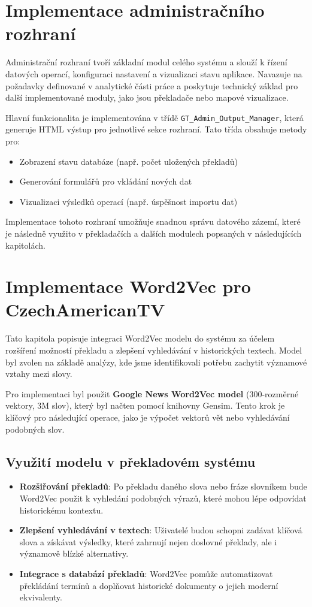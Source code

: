 \documentclass[czech, ba, kiv, he]{fasthesis}
\begin{document}
\section{Implementace administračního rozhraní}

Administrační rozhraní tvoří základní modul celého systému a slouží k řízení datových operací, konfiguraci nastavení a vizualizaci stavu aplikace. Navazuje na požadavky definované v analytické části práce a poskytuje technický základ pro další implementované moduly, jako jsou překladače nebo mapové vizualizace.

Hlavní funkcionalita je implementována v třídě \texttt{GT\_Admin\_Output\_Manager}, která generuje HTML výstup pro jednotlivé sekce rozhraní. Tato třída obsahuje metody pro:

\begin{itemize}
    \item Zobrazení stavu databáze (např. počet uložených překladů)
    \item Generování formulářů pro vkládání nových dat
    \item Vizualizaci výsledků operací (např. úspěšnost importu dat)
\end{itemize}

Implementace tohoto rozhraní umožňuje snadnou správu datového zázemí, které je následně využito v překladačích a dalších modulech popsaných v následujících kapitolách.

\section{Implementace Word2Vec pro CzechAmericanTV}

Tato kapitola popisuje integraci Word2Vec modelu do systému za účelem rozšíření možností překladu a zlepšení vyhledávání v historických textech. Model byl zvolen na základě analýzy, kde jsme identifikovali potřebu zachytit významové vztahy mezi slovy.

Pro implementaci byl použit \textbf{Google News Word2Vec model} (300-rozměrné vektory, 3M slov), který byl načten pomocí knihovny Gensim. Tento krok je klíčový pro následující operace, jako je výpočet vektorů vět nebo vyhledávání podobných slov.

\subsection{Využití modelu v překladovém systému}

\begin{itemize}  
    \item \textbf{Rozšiřování překladů}: Po překladu daného slova nebo fráze slovníkem bude Word2Vec použit k vyhledání podobných výrazů, které mohou lépe odpovídat historickému kontextu.  
    \item \textbf{Zlepšení vyhledávání v textech}: Uživatelé budou schopni zadávat klíčová slova a získávat výsledky, které zahrnují nejen doslovné překlady, ale i významově blízké alternativy.  
    \item \textbf{Integrace s databází překladů}: Word2Vec pomůže automatizovat překládání termínů a doplňovat historické dokumenty o jejich moderní ekvivalenty.  
\end{itemize}  
\end{document}
